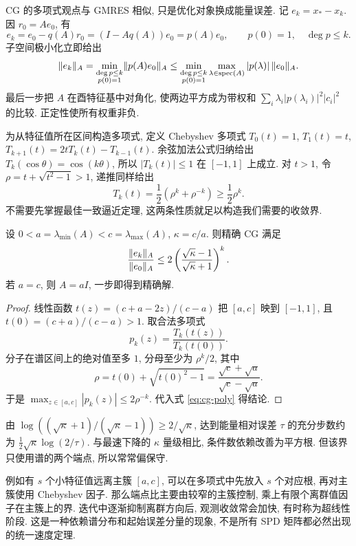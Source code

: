 CG 的多项式观点与 GMRES 相似, 只是优化对象换成能量误差. 记 $e_k=x_*-x_k$. 因 $r_0=Ae_0$, 有
\[
e_k=e_0-q(A)r_0=(I-Aq(A))e_0=p(A)e_0,\qquad p(0)=1,\quad\deg p\le k.
\]
子空间极小化立即给出
\begin{equation}\label{eq:cg-poly}
\lVert e_k\rVert_A=
\min_{\substack{\deg p\le k\\p(0)=1}}\lVert p(A)e_0\rVert_A
\le\min_{\substack{\deg p\le k\\p(0)=1}}
\max_{\lambda\in\operatorname{spec}(A)}|p(\lambda)|\,\lVert e_0\rVert_A.
\end{equation}
最后一步把 $A$ 在酉特征基中对角化, 使两边平方成为带权和 $\sum_i\lambda_i|p(\lambda_i)|^2|c_i|^2$ 的比较. 正定性使所有权重非负.

为从特征值所在区间构造多项式, 定义 Chebyshev 多项式 $T_0(t)=1$, $T_1(t)=t$, $T_{k+1}(t)=2tT_k(t)-T_{k-1}(t)$. 余弦加法公式归纳给出
$T_k(\cos\theta)=\cos(k\theta)$, 所以 $|T_k(t)|\le1$ 在 $[-1,1]$ 上成立. 对 $t>1$, 令 $\rho=t+\sqrt{t^2-1}>1$, 递推同样给出
\[
T_k(t)=\frac12(\rho^k+\rho^{-k})\ge\frac12\rho^k.
\]
不需要先掌握最佳一致逼近定理, 这两条性质就足以构造我们需要的收敛界.

\begin{theorem}[CG 的条件数界]\label{thm:cg-chebyshev}
设 $0<a=\lambda_{\min}(A)<c=\lambda_{\max}(A)$, $\kappa=c/a$. 则精确 CG 满足
\begin{equation}\label{eq:cg-chebyshev}
\frac{\lVert e_k\rVert_A}{\lVert e_0\rVert_A}
\le2\left(\frac{\sqrt\kappa-1}{\sqrt\kappa+1}\right)^k.
\end{equation}
若 $a=c$, 则 $A=aI$, 一步即得到精确解.
\end{theorem}
\begin{proof}
线性函数 $t(z)=(c+a-2z)/(c-a)$ 把 $[a,c]$ 映到 $[-1,1]$, 且 $t(0)=(c+a)/(c-a)>1$. 取合法多项式
\[
p_k(z)=\frac{T_k(t(z))}{T_k(t(0))}.
\]
分子在谱区间上的绝对值至多 $1$, 分母至少为 $\rho^k/2$, 其中
\[
\rho=t(0)+\sqrt{t(0)^2-1}
=\frac{\sqrt c+\sqrt a}{\sqrt c-\sqrt a}.
\]
于是 $\max_{z\in[a,c]}|p_k(z)|\le2\rho^{-k}$. 代入式 \eqref{eq:cg-poly} 得结论.
\end{proof}
由 $\log((\sqrt\kappa+1)/(\sqrt\kappa-1))\ge2/\sqrt\kappa$, 达到能量相对误差 $\tau$ 的充分步数约为
$\tfrac12\sqrt\kappa\log(2/\tau)$. 与最速下降的 $\kappa$ 量级相比, 条件数依赖改善为平方根. 但该界只使用谱的两个端点, 所以常常偏保守.

例如有 $s$ 个小特征值远离主簇 $[a,c]$, 可以在多项式中先放入 $s$ 个对应根, 再对主簇使用 Chebyshev 因子. 那么端点比主要由较窄的主簇控制, 乘上有限个离群值因子在主簇上的界. 迭代中逐渐抑制离群方向后, 观测收敛常会加快, 有时称为超线性阶段. 这是一种依赖谱分布和起始误差分量的现象, 不是所有 SPD 矩阵都必然出现的统一速度定理.

